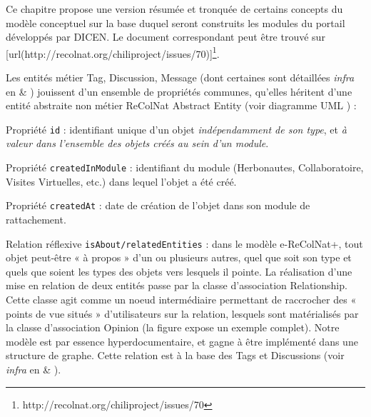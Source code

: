 \startchapter[title={Tags & Discussions}]

Ce chapitre propose une version résumée et tronquée de certains concepts du modèle conceptuel sur la base duquel seront construits les modules du portail développés par DICEN. Le document correspondant peut être trouvé sur [url(http://recolnat.org/chiliproject/issues/70)]\footnote{http://recolnat.org/chiliproject/issues/70}.

\startsection[title={Propriétés communes aux entités du modèle ReColNat+}]

Les entités métier Tag, Discussion, Message (dont certaines sont détaillées {\em infra} en  & ) jouissent d'un ensemble de propriétés communes, qu'elles héritent d'une entité abstraite non métier ReColNat Abstract Entity (voir diagramme UML ) :

\startitemize
\item Propriété {\tt id} : identifiant unique d'un objet {\em indépendamment de son type}, et {\em à valeur dans l'ensemble des objets créés au sein d'un module}.
\item Propriété {\tt createdInModule} : identifiant du module (Herbonautes, Collaboratoire, Visites Virtuelles, etc.) dans lequel l'objet a été créé. 
\item Propriété {\tt createdAt} : date de création de l'objet dans son module de rattachement.
\item Relation réflexive {\tt isAbout/relatedEntities} : dans le modèle e-ReColNat+, tout objet peut-être « à propos » d'un ou plusieurs autres, quel que soit son type et quels que soient les types des objets vers lesquels il pointe.
La réalisation d'une mise en relation de deux entités passe par la classe d'association Relationship.
Cette classe agit comme un noeud intermédiaire permettant de raccrocher des « points de vue situés » d'utilisateurs sur la relation, lesquels sont matérialisés par la classe d'association Opinion (la figure  expose un exemple complet).
Notre modèle est par essence hyperdocumentaire, et gagne à être implémenté dans une structure de graphe.
Cette relation est à la base des Tags et Discussions (voir {\em infra} en  & ).
\stopitemize

